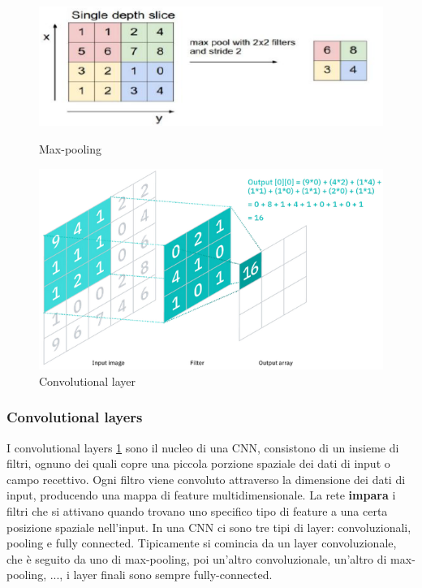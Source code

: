 	\begin{figure}
		\centering
		\begin{minipage}{.5\textwidth}
			\centering
			\includegraphics[width=0.8\linewidth]{imgs/chapter11/img12}
			\caption{Max-pooling}
			\label{fig:chapter11-12}		
		\end{minipage}%
		\begin{minipage}{.5\textwidth}
			\centering
			\includegraphics[width=0.8\linewidth]{imgs/chapter11/img18}
			\caption{Convolutional layer}
			\label{fig:chapter11-18}
		\end{minipage}
	\end{figure}

		\subsubsection{Convolutional layers}
		I convolutional layers \ref{fig:chapter11-18} sono il nucleo di una CNN, consistono di un insieme di filtri, ognuno dei quali copre una piccola porzione spaziale dei dati di input o campo recettivo.
		Ogni filtro viene convoluto attraverso la dimensione dei dati di input, producendo una mappa di feature multidimensionale.
		La rete \textbf{impara} i filtri che si attivano quando trovano uno specifico tipo di feature a una certa posizione spaziale nell'input. 
		In una CNN ci sono tre tipi di layer: convoluzionali, pooling e fully connected. 
		Tipicamente si comincia da un layer convoluzionale, che \`e seguito da uno di max-pooling, poi un'altro convoluzionale, un'altro di max-pooling, ..., i layer finali sono sempre fully-connected.
		
